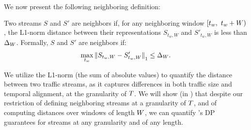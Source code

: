 We now present the following neighboring definition:
\begin{definition}
\label{def:neighboring-streams}
Two streams $S$ and $S'$ are neighbors if, for any neighboring window
$[t_w,~t_w +W)$, the L1-norm distance between their representations
$S_{t_w, W}$ and  $S'_{t_w, W}$  is less than $\Delta_{W}$.
Formally, $S$ and $S'$ are neighbors if:
\begin{equation}
\max_{t_w} {\|S_{t_w, W} - S'_{t_w, W}\|}_1 \leq \Delta_{W} .
\end{equation}
\end{definition}
We utilize the L1-norm (the sum of absolute values) to quantify the distance
between two traffic streams, as it captures differences in both traffic size and
temporal alignment, at the granularity of $T$.
%
%
We will show (in ) that despite our restriction
of defining neighboring streams at a granularity of $T$, and of computing
distances over windows of length $W$, we can quantify {\sys}'s DP
guarantees for streams at any granularity and of any length.

